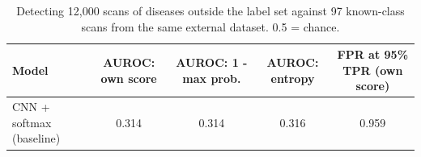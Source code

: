\begin{table}[t]
\centering
\small
\caption{Detecting 12,000 scans of diseases outside the label set against 97 known-class scans from the same external dataset. 0.5 = chance.}
\label{tab:unseen}
\begin{tabular}{lcccc}
\toprule
Model & AUROC: own score & AUROC: 1 - max prob. & AUROC: entropy & FPR at 95\% TPR (own score) \\
\midrule
CNN + softmax (baseline) & 0.314 & 0.314 & 0.316 & 0.959 \\
\bottomrule
\end{tabular}
\end{table}